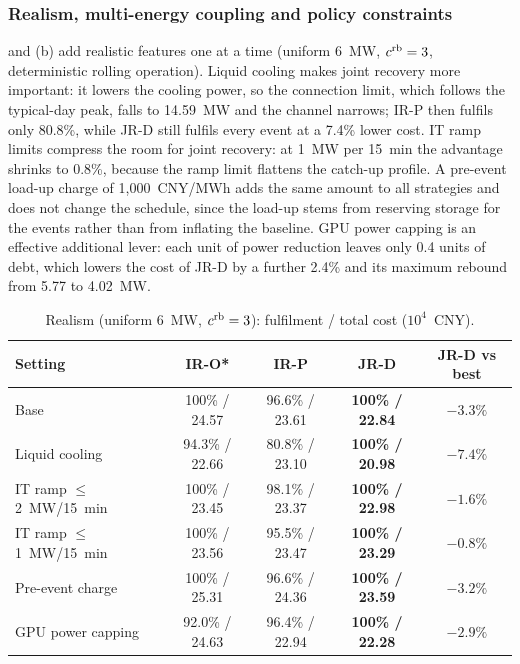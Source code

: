 \subsubsection{Realism, multi-energy coupling and policy constraints}
\label{sec:sens-real}

 and (b) add realistic features one at a time (uniform 6~MW, $c^{\mathrm{rb}}=3$,
deterministic rolling operation). Liquid cooling makes joint recovery more important: it lowers the cooling power, so the
connection limit, which follows the typical-day peak, falls to 14.59~MW and the channel narrows; IR-P then fulfils only
80.8\%, while JR-D still fulfils every event at a 7.4\% lower cost. IT ramp limits compress the room for joint recovery:
at 1~MW per 15~min the advantage shrinks to 0.8\%, because the ramp limit flattens the catch-up profile. A pre-event
load-up charge of 1,000~CNY/MWh adds the same amount to all strategies and does not change the schedule, since the
load-up stems from reserving storage for the events rather than from inflating the baseline. GPU power capping is an
effective additional lever: each unit of power reduction leaves only 0.4 units of debt, which lowers the cost of JR-D by
a further 2.4\% and its maximum rebound from 5.77 to 4.02~MW.

\begin{table}[!t]
\caption{Realism (uniform 6~MW, $c^{\mathrm{rb}}=3$): fulfilment / total cost ($10^4$~CNY).}
\label{tab:realism}
\centering\footnotesize
\setlength{\tabcolsep}{2.6pt}
\begin{tabular}{@{}lcccc@{}}
\toprule
Setting & IR-O* & IR-P & \textbf{JR-D} & JR-D vs best\\
\midrule
Base & 100\% / 24.57 & 96.6\% / 23.61 & \textbf{100\% / 22.84} & $-3.3\%$\\
Liquid cooling & 94.3\% / 22.66 & 80.8\% / 23.10 & \textbf{100\% / 20.98} & $-7.4\%$\\
IT ramp $\le$2~MW/15~min & 100\% / 23.45 & 98.1\% / 23.37 & \textbf{100\% / 22.98} & $-1.6\%$\\
IT ramp $\le$1~MW/15~min & 100\% / 23.56 & 95.5\% / 23.47 & \textbf{100\% / 23.29} & $-0.8\%$\\
Pre-event charge & 100\% / 25.31 & 96.6\% / 24.36 & \textbf{100\% / 23.59} & $-3.2\%$\\
GPU power capping & 92.0\% / 24.63 & 96.4\% / 22.94 & \textbf{100\% / 22.28} & $-2.9\%$\\
\bottomrule
\end{tabular}
\end{table}

